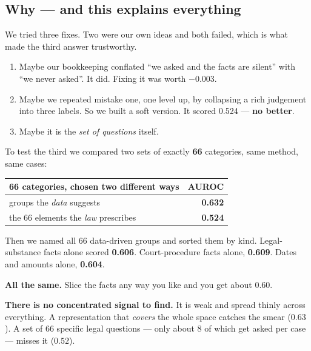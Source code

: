 \documentclass[12pt,a4paper]{article}
\begin{document}
\subsection{Why --- and this explains everything}

We tried three fixes. Two were our own ideas and both failed, which is what made the third answer
trustworthy.

\begin{enumerate}
\item Maybe our bookkeeping conflated ``we asked and the facts are silent'' with ``we never asked''.
      It did. Fixing it was worth $-0.003$.
\item Maybe we repeated mistake one, one level up, by collapsing a rich judgement into three labels.
      So we built a soft version. It scored 0.524 --- \textbf{no better}.
\item Maybe it is the \emph{set of questions} itself.
\end{enumerate}

To test the third we compared two sets of exactly \textbf{66} categories, same method, same cases:

\begin{center}
\begin{tabular}{@{}lr@{}}
\toprule
\textbf{66 categories, chosen two different ways} & \textbf{AUROC} \\
\midrule
groups the \emph{data} suggests & \textbf{0.632} \\
the 66 elements the \emph{law} prescribes & \textbf{0.524} \\
\bottomrule
\end{tabular}
\end{center}

Then we named all 66 data-driven groups and sorted them by kind. Legal-substance facts alone scored
\textbf{0.606}. Court-procedure facts alone, \textbf{0.609}. Dates and amounts alone, \textbf{0.604}.

\begin{tcolorbox}[plainbox,title={The explanation}]
\textbf{All the same.} Slice the facts any way you like and you get about 0.60.

\smallskip
\textbf{There is no concentrated signal to find.} It is weak and spread thinly across everything. A
representation that \emph{covers} the whole space catches the smear ($0.63$). A set of 66 specific
legal questions --- only about 8 of which get asked per case --- misses it ($0.52$).
\end{tcolorbox}
\end{document}
